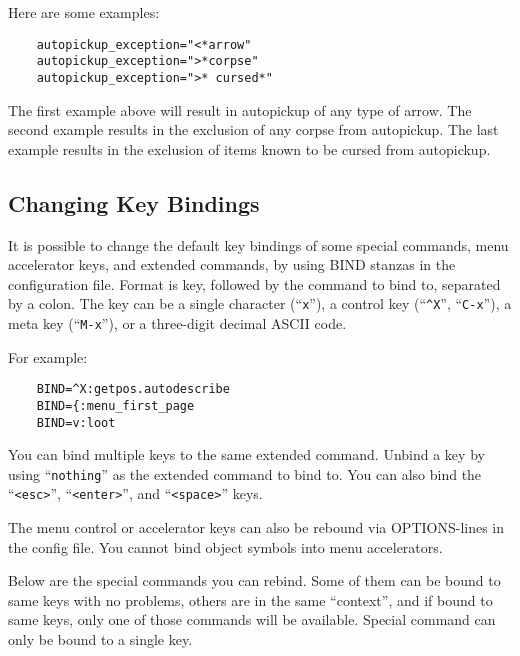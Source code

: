 Here are some examples:
\begin{verbatim}
    autopickup_exception="<*arrow"
    autopickup_exception=">*corpse"
    autopickup_exception=">* cursed*"
\end{verbatim}

The first example above will result in autopickup of any type of arrow.
The second example results in the exclusion of any corpse from autopickup.
The last example results in the exclusion of items known to be cursed from
autopickup.


\subsection*{Changing Key Bindings}

It is possible to change the default key bindings of some special commands,
menu accelerator keys, and extended commands, by using BIND stanzas in the
configuration file. Format is key, followed by the command to bind to,
separated by a colon. The key can be a single character (``{\tt x}''),
a control key (``{\tt \^{}X}'', ``{\tt C-x}''), a meta key (``{\tt M-x}''),
or a three-digit decimal ASCII code.

For example:

\begin{verbatim}
    BIND=^X:getpos.autodescribe
    BIND={:menu_first_page
    BIND=v:loot
\end{verbatim}

\blist{}
\item[\tb{Extended command keys}]
You can bind multiple keys to the same extended command. Unbind a key by
using ``{\tt nothing}'' as the extended command to bind to. You can also bind
the ``{\tt <esc>}'', ``{\tt <enter>}'', and ``{\tt <space>}'' keys.

\item[\tb{Menu accelerator keys}]
The menu control or accelerator keys can also be rebound via OPTIONS-lines
in the config file. You cannot bind object symbols into menu accelerators.

\item[\tb{Special command keys}]
Below are the special commands you can rebind. Some of them can be bound to
same keys with no problems, others are in the same ``context'', and if bound
to same keys, only one of those commands will be available. Special command
can only be bound to a single key.

